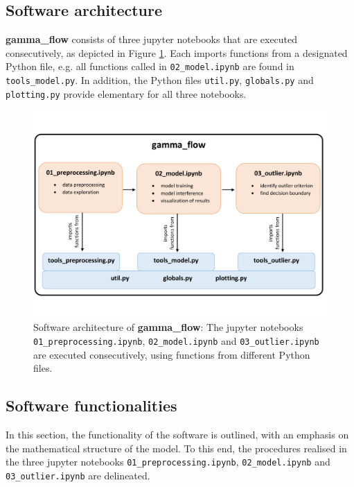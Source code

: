 \documentclass[preprint,12pt, a4paper]{elsarticle}
\begin{document}
\subsection{Software architecture}
\textbf{gamma\_flow} consists of three jupyter notebooks that are executed consecutively, as depicted in Figure \ref{fig:software_architecture}. Each imports functions from a designated Python file, e.g. all functions called in \texttt{02\_model.ipynb} are found in \texttt{tools\_model.py}. In addition, the Python files \texttt{util.py}, \texttt{globals.py} and \texttt{plotting.py} provide elementary for all three notebooks. 

\begin{figure}[ht]
\includegraphics[width=\textwidth]{software_architecture_gamma_flow.pdf}
\caption{Software architecture of \textbf{gamma\_flow}: The jupyter notebooks \texttt{01\_preprocessing.ipynb}, \texttt{02\_model.ipynb} and \texttt{03\_outlier.ipynb} are executed consecutively, using functions from different Python files. }
\label{fig:software_architecture}
\end{figure}

\subsection{Software functionalities}

In this section, the functionality of the software is outlined, with an emphasis on the mathematical structure of the model. To this end, the procedures realised in the three jupyter notebooks \texttt{01\_preprocessing.ipynb}, \texttt{02\_model.ipynb} and \texttt{03\_outlier.ipynb} are delineated. 
\end{document}
